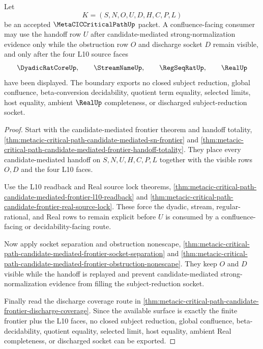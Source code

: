 \begin{theorem}
\label{thm:metacic-critical-path-candidate-frontier-confluence-socket-boundary}
Let
$$
K=(S,N,O,U,D,H,C,P,L)
$$
be an accepted $\MetaCICCriticalPathUp$ packet. A confluence-facing consumer may use the handoff row $U$ after candidate-mediated strong-normalization evidence only while the obstruction row $O$ and discharge socket $D$ remain visible, and only after the four L10 source faces
$$
\DyadicRatCoreUp,\qquad
\StreamNameUp,\qquad
\RegSeqRatUp,\qquad
\RealUp
$$
have been displayed. The boundary exports no closed subject reduction, global confluence, beta-conversion decidability, quotient term equality, selected limits, host equality, ambient $\RealUp$ completeness, or discharged subject-reduction socket.
\end{theorem}
\begin{proof}
Start with the candidate-mediated frontier theorem and handoff totality, \autoref{thm:metacic-critical-path-candidate-mediated-sn-frontier} and \autoref{thm:metacic-critical-path-candidate-mediated-frontier-handoff-totality}. They place every candidate-mediated handoff on $S,N,U,H,C,P,L$ together with the visible rows $O,D$ and the four L10 faces.

Use the L10 readback and Real source lock theorems, \autoref{thm:metacic-critical-path-candidate-mediated-frontier-l10-readback} and \autoref{thm:metacic-critical-path-candidate-frontier-real-source-lock}. These force the dyadic, stream, regular-rational, and Real rows to remain explicit before $U$ is consumed by a confluence-facing or decidability-facing route.

Now apply socket separation and obstruction nonescape, \autoref{thm:metacic-critical-path-candidate-mediated-frontier-socket-separation} and \autoref{thm:metacic-critical-path-candidate-mediated-frontier-obstruction-nonescape}. They keep $O$ and $D$ visible while the handoff is replayed and prevent candidate-mediated strong-normalization evidence from filling the subject-reduction socket.

Finally read the discharge coverage route in \autoref{thm:metacic-critical-path-candidate-frontier-discharge-coverage}. Since the available surface is exactly the finite frontier plus the L10 faces, no closed subject reduction, global confluence, beta-decidability, quotient equality, selected limit, host equality, ambient Real completeness, or discharged socket can be exported.
\end{proof}

